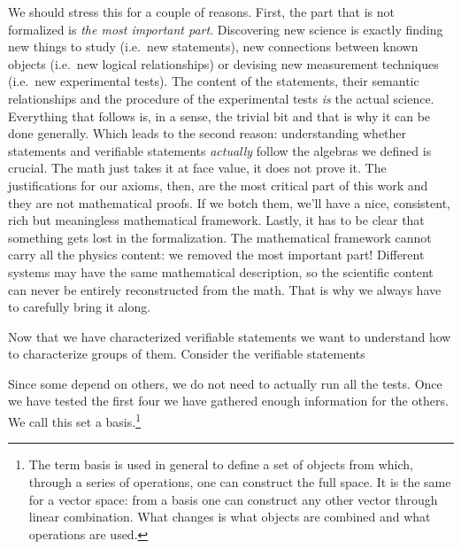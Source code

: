 \documentclass[11pt,letterpaper,fleqn]{memoir} %
\begin{document}
We should stress this for a couple of reasons. First, the part that is not formalized is \emph{the most important part}. Discovering new science is exactly finding new things to study (i.e.~new statements), new connections between known objects (i.e.~new logical relationships) or devising new measurement techniques (i.e.~new experimental tests). The content of the statements, their semantic relationships and the procedure of the experimental tests \emph{is} the actual science. Everything that follows is, in a sense, the trivial bit and that is why it can be done generally. Which leads to the second reason: understanding whether statements and verifiable statements \emph{actually} follow the algebras we defined is crucial. The math just takes it at face value, it does not prove it. The justifications for our axioms, then, are the most critical part of this work and they are not mathematical proofs. If we botch them, we'll have a nice, consistent, rich but meaningless mathematical framework. Lastly, it has to be clear that something gets lost in the formalization. The mathematical framework cannot carry all the physics content: we removed the most important part! Different systems may have the same mathematical description, so the scientific content can never be entirely reconstructed from the math. That is why we always have to carefully bring it along.

Now that we have characterized verifiable statements we want to understand how to characterize groups of them. Consider the verifiable statements
\begin{description}
	\item {}
	\item {}
	\item {}
	\item {}
	\item {}
	\item {}
	\item {}
\end{description}
Since some depend on others, we do not need to actually run all the tests. Once we have tested the first four we have gathered enough information for the others. We call this set a basis.\footnote{The term basis is used in general to define a set of objects from which, through a series of operations, one can construct the full space. It is the same for a vector space: from a basis one can construct any other vector through linear combination. What changes is what objects are combined and what operations are used.}
\end{document}
